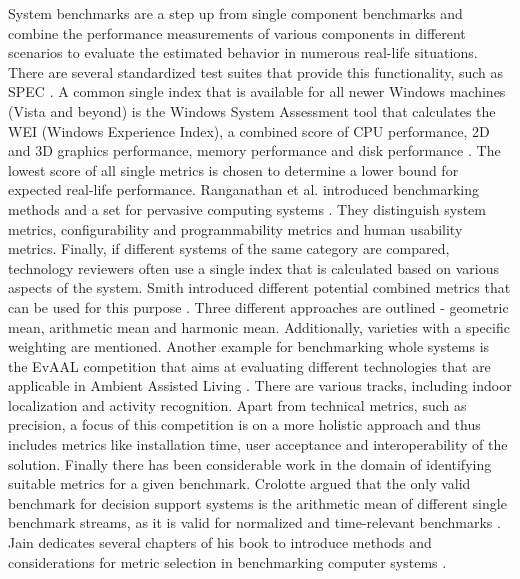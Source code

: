 System benchmarks are a step up from single component benchmarks and combine the performance measurements of various components in different scenarios to evaluate the estimated behavior in numerous real-life situations. There are several standardized test suites that provide this functionality, such as SPEC \cite{henning2000spec}. A common single index that is available for all newer Windows machines (Vista and beyond) is the Windows System Assessment tool that calculates the WEI (Windows Experience Index), a combined score of CPU performance, 2D and 3D graphics performance, memory performance and disk performance \cite{microsoftWEI}. The lowest score of all single metrics is chosen to determine a lower bound for expected real-life performance. Ranganathan et al. introduced benchmarking methods and a set for pervasive computing systems \cite{ranganathan2005towards}. They distinguish system metrics, configurability and programmability metrics and human usability metrics.
Finally, if different systems of the same category are compared, technology reviewers often use a single index that is calculated based on various aspects of the system. Smith introduced different potential combined metrics that can be used for this purpose \cite{smith1988characterizing}. Three different approaches are outlined - geometric mean, arithmetic mean and harmonic mean. Additionally, varieties with a specific weighting are mentioned. Another example for benchmarking whole systems is the EvAAL competition that aims at evaluating different technologies that are applicable in Ambient Assisted Living \cite{chessa_eval}. There are various tracks, including indoor localization and activity recognition. Apart from technical metrics, such as precision, a focus of this competition is on a more holistic approach and thus includes metrics like installation time, user acceptance and interoperability of the solution. 
Finally there has been considerable work in the domain of identifying suitable metrics for a given benchmark. Crolotte argued that the only valid benchmark for decision support systems is the arithmetic mean of different single benchmark streams, as it is valid for normalized and time-relevant benchmarks \cite{crolotte2009issues}.  Jain dedicates several chapters of his book to introduce methods and considerations for metric selection in benchmarking computer systems \cite{jain1991art}. 

